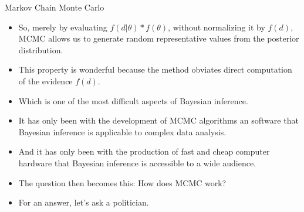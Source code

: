 \documentclass[handout]{beamer}
\begin{document}
\begin{frame}{Markov Chain Monte Carlo}
\scriptsize{
\begin{itemize}
\item So, merely by evaluating $f(d|\theta)*f(\theta)$, without normalizing it by $f(d)$, MCMC allows us to generate random representative values from the posterior distribution.

\item This property is wonderful because the method obviates direct computation of the evidence $f(d)$.

\item Which is one of the most difficult aspects of Bayesian inference.

\item It has only been with the development of MCMC algorithms an software that Bayesian inference is applicable to complex data analysis.
\item And it has only been with the production of fast and cheap computer hardware that Bayesian inference is accessible to a wide audience.

\item The question then becomes this: How does MCMC work?

\item For an answer, let's ask a politician.

\end{itemize}



}

\end{frame}
\end{document}
